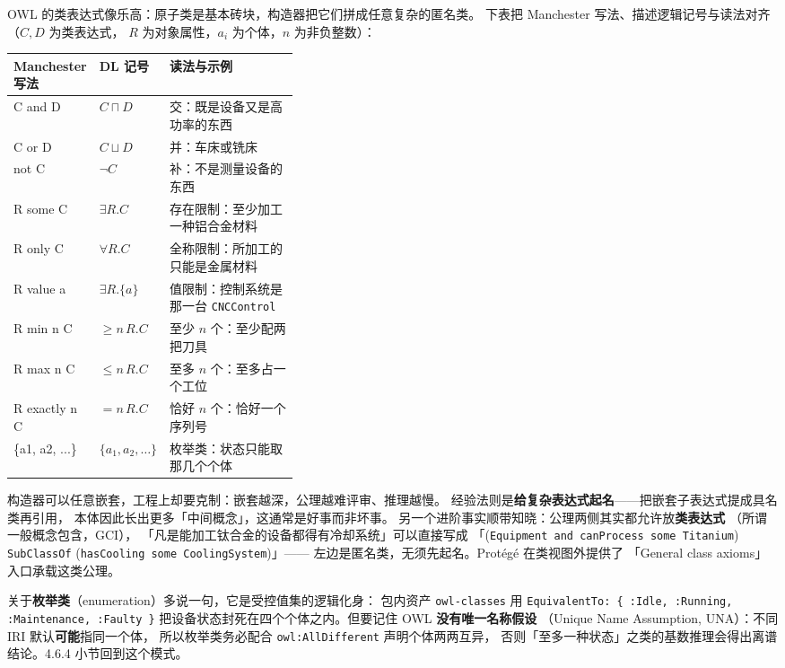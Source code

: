 OWL 的类表达式像乐高：原子类是基本砖块，构造器把它们拼成任意复杂的匿名类。
下表把 Manchester 写法、描述逻辑记号与读法对齐（\(C, D\) 为类表达式，
\(R\) 为对象属性，\(a_i\) 为个体，\(n\) 为非负整数）：

\begin{center}
\small
\begin{tabularx}{\linewidth}{@{}>{\ttfamily}p{0.24\linewidth}p{0.13\linewidth}X@{}}
\toprule
\normalfont\textbf{Manchester 写法} & \textbf{DL 记号} & \textbf{读法与示例} \\
\midrule
C and D & \(C \sqcap D\) & 交：既是设备又是高功率的东西 \\
C or D & \(C \sqcup D\) & 并：车床或铣床 \\
not C & \(\lnot C\) & 补：不是测量设备的东西 \\
R some C & \(\exists R.C\) & 存在限制：至少加工一种铝合金材料 \\
R only C & \(\forall R.C\) & 全称限制：所加工的只能是金属材料 \\
R value a & \(\exists R.\{a\}\) & 值限制：控制系统是那一台 \texttt{CNCControl} \\
R min n C & \(\ge n\,R.C\) & 至少 \(n\) 个：至少配两把刀具 \\
R max n C & \(\le n\,R.C\) & 至多 \(n\) 个：至多占一个工位 \\
R exactly n C & \(= n\,R.C\) & 恰好 \(n\) 个：恰好一个序列号 \\
\{a1, a2, ...\} & \(\{a_1, a_2, \dots\}\) & 枚举类：状态只能取那几个个体 \\
\bottomrule
\end{tabularx}
\end{center}

构造器可以任意嵌套，工程上却要克制：嵌套越深，公理越难评审、推理越慢。
经验法则是\textbf{给复杂表达式起名}——把嵌套子表达式提成具名类再引用，
本体因此长出更多「中间概念」，这通常是好事而非坏事。
另一个进阶事实顺带知晓：公理两侧其实都允许放\textbf{类表达式}
（所谓一般概念包含，GCI），
「凡是能加工钛合金的设备都得有冷却系统」可以直接写成
「(\texttt{Equipment and canProcess some Titanium})
\texttt{SubClassOf} (\texttt{hasCooling some CoolingSystem})」——
左边是匿名类，无须先起名。Protégé 在类视图外提供了
「General class axioms」入口承载这类公理。

关于\textbf{枚举类}（enumeration）多说一句，它是受控值集的逻辑化身：
包内资产 \texttt{owl-classes} 用
\texttt{EquivalentTo: \{ :Idle, :Running, :Maintenance, :Faulty \}}
把设备状态封死在四个个体之内。但要记住 OWL \textbf{没有唯一名称假设}
（Unique Name Assumption, UNA）：不同 IRI 默认\textbf{可能}指同一个体，
所以枚举类务必配合 \texttt{owl:AllDifferent} 声明个体两两互异，
否则「至多一种状态」之类的基数推理会得出离谱结论。4.6.4 小节回到这个模式。

